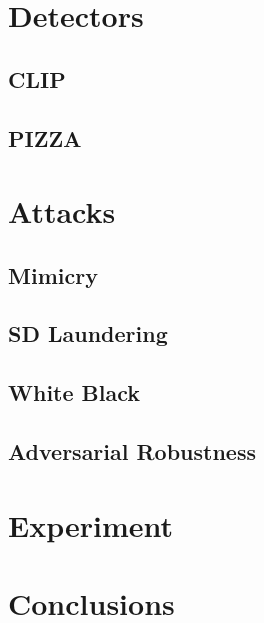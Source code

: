 \documentclass[conference]{IEEEtran} %
\begin{document}
    \cite{zhu2005semi}


\section{Detectors}
    \subsection{CLIP}
    \subsection{PIZZA}
\section{Attacks}
    \subsection{Mimicry}
    \subsection{SD Laundering}
    \subsection{White Black}
    \subsection{Adversarial Robustness}
\section{Experiment}
\section{Conclusions}

\end{document}
